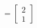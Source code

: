 \documentclass[preview]{standalone}
\begin{document}
\begin{align*}
= \begin{bmatrix} 2 \\ 1 \end{bmatrix}
\end{align*}
\end{document}
